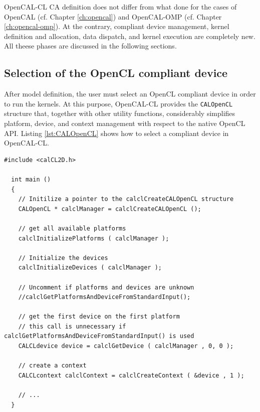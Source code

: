 OpenCAL-CL CA definition does not differ from what done for the cases
of OpenCAL (cf. Chapter \ref{ch:opencal}) and OpenCAL-OMP (cf. Chapter
\ref{ch:opencal-omp}). At the contrary, compliant device management,
kernel definition and allocation, data dispatch, and kernel execution
are completely new. All theese phases are discussed in the following
sections.

\subsection{Selection of the OpenCL compliant device}

After model definition, the user must select an OpenCL compliant
device in order to run the kernels. At this purpose, OpenCAL-CL
provides the \verb'CALOpenCL' structure that, together with other
utility functions, considerably simplifies platform, device, and
context management with respect to the native OpenCL API. Listing
\ref{lst:CALOpenCL} shows how to select a compliant device in
OpenCAL-CL.

\begin{lstlisting}[float,floatplacement=H, label=lst:CALOpenCL, caption=Access to platform and devices.]
  #include <calCL2D.h>

  int main ()
  {
    // Initilize a pointer to the calclCreateCALOpenCL structure
    CALOpenCL * calclManager = calclCreateCALOpenCL ();

    // get all available platforms
    calclInitializePlatforms ( calclManager );

    // Initialize the devices
    calclInitializeDevices ( calclManager );

    // Uncomment if platforms and devices are unknown
    //calclGetPlatformsAndDeviceFromStandardInput();

    // get the first device on the first platform
    // this call is unnecessary if calclGetPlatformsAndDeviceFromStandardInput() is used
    CALCLdevice device = calclGetDevice ( calclManager , 0, 0 );

    // create a context
    CALCLcontext calclContext = calclCreateContext ( &device , 1 );

    // ...
  }
\end{lstlisting}

